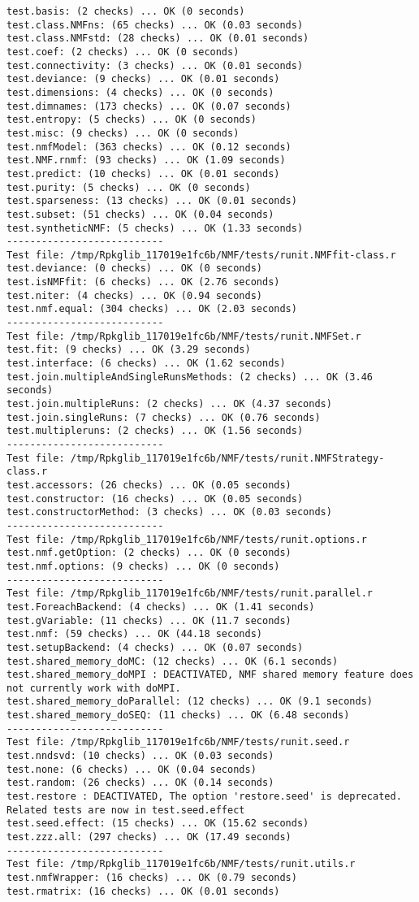 \documentclass[10pt]{article}\usepackage[]{graphicx}\usepackage[]{color}
\begin{document}
\begin{verbatim}
test.basis: (2 checks) ... OK (0 seconds)
test.class.NMFns: (65 checks) ... OK (0.03 seconds)
test.class.NMFstd: (28 checks) ... OK (0.01 seconds)
test.coef: (2 checks) ... OK (0 seconds)
test.connectivity: (3 checks) ... OK (0.01 seconds)
test.deviance: (9 checks) ... OK (0.01 seconds)
test.dimensions: (4 checks) ... OK (0 seconds)
test.dimnames: (173 checks) ... OK (0.07 seconds)
test.entropy: (5 checks) ... OK (0 seconds)
test.misc: (9 checks) ... OK (0 seconds)
test.nmfModel: (363 checks) ... OK (0.12 seconds)
test.NMF.rnmf: (93 checks) ... OK (1.09 seconds)
test.predict: (10 checks) ... OK (0.01 seconds)
test.purity: (5 checks) ... OK (0 seconds)
test.sparseness: (13 checks) ... OK (0.01 seconds)
test.subset: (51 checks) ... OK (0.04 seconds)
test.syntheticNMF: (5 checks) ... OK (1.33 seconds)
--------------------------- 
Test file: /tmp/Rpkglib_117019e1fc6b/NMF/tests/runit.NMFfit-class.r 
test.deviance: (0 checks) ... OK (0 seconds)
test.isNMFfit: (6 checks) ... OK (2.76 seconds)
test.niter: (4 checks) ... OK (0.94 seconds)
test.nmf.equal: (304 checks) ... OK (2.03 seconds)
--------------------------- 
Test file: /tmp/Rpkglib_117019e1fc6b/NMF/tests/runit.NMFSet.r 
test.fit: (9 checks) ... OK (3.29 seconds)
test.interface: (6 checks) ... OK (1.62 seconds)
test.join.multipleAndSingleRunsMethods: (2 checks) ... OK (3.46 seconds)
test.join.multipleRuns: (2 checks) ... OK (4.37 seconds)
test.join.singleRuns: (7 checks) ... OK (0.76 seconds)
test.multipleruns: (2 checks) ... OK (1.56 seconds)
--------------------------- 
Test file: /tmp/Rpkglib_117019e1fc6b/NMF/tests/runit.NMFStrategy-class.r 
test.accessors: (26 checks) ... OK (0.05 seconds)
test.constructor: (16 checks) ... OK (0.05 seconds)
test.constructorMethod: (3 checks) ... OK (0.03 seconds)
--------------------------- 
Test file: /tmp/Rpkglib_117019e1fc6b/NMF/tests/runit.options.r 
test.nmf.getOption: (2 checks) ... OK (0 seconds)
test.nmf.options: (9 checks) ... OK (0 seconds)
--------------------------- 
Test file: /tmp/Rpkglib_117019e1fc6b/NMF/tests/runit.parallel.r 
test.ForeachBackend: (4 checks) ... OK (1.41 seconds)
test.gVariable: (11 checks) ... OK (11.7 seconds)
test.nmf: (59 checks) ... OK (44.18 seconds)
test.setupBackend: (4 checks) ... OK (0.07 seconds)
test.shared_memory_doMC: (12 checks) ... OK (6.1 seconds)
test.shared_memory_doMPI : DEACTIVATED, NMF shared memory feature does not currently work with doMPI.
test.shared_memory_doParallel: (12 checks) ... OK (9.1 seconds)
test.shared_memory_doSEQ: (11 checks) ... OK (6.48 seconds)
--------------------------- 
Test file: /tmp/Rpkglib_117019e1fc6b/NMF/tests/runit.seed.r 
test.nndsvd: (10 checks) ... OK (0.03 seconds)
test.none: (6 checks) ... OK (0.04 seconds)
test.random: (26 checks) ... OK (0.14 seconds)
test.restore : DEACTIVATED, The option 'restore.seed' is deprecated. Related tests are now in test.seed.effect
test.seed.effect: (15 checks) ... OK (15.62 seconds)
test.zzz.all: (297 checks) ... OK (17.49 seconds)
--------------------------- 
Test file: /tmp/Rpkglib_117019e1fc6b/NMF/tests/runit.utils.r 
test.nmfWrapper: (16 checks) ... OK (0.79 seconds)
test.rmatrix: (16 checks) ... OK (0.01 seconds)


\end{verbatim}
\end{document}
